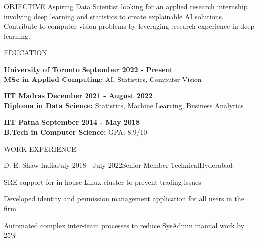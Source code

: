 \documentclass{resume}
\begin{document}
  \begin{rSection}{OBJECTIVE}
    Aspiring Data Scientist looking for an applied research internship involving deep learning
    and statistics to create explainable AI solutions. Contribute to computer vision problems
    by leveraging research experience in deep learning.
  \end{rSection}

  \begin{rSection}{EDUCATION}

    {\bf University of Toronto} \hfill {\bf September 2022 - Present} \\
    {\bf MSc in Applied Computing:} AI, Statistics, Computer Vision

    {\bf IIT Madras} \hfill {\bf December 2021 - August 2022} \\
    {\bf Diploma in Data Science:} Statistics, Machine Learning, Business Analytics

    {\bf IIT Patna} \hfill {\bf September 2014 - May 2018} \\
    {\bf B.Tech in Computer Science:} GPA: 8.9/10

  \end{rSection}

  \begin{rSection}{WORK EXPERIENCE}
  
    \begin{rSubsection}{D. E. Shaw India}{July 2018 - July 2022}{Senior Member Technical}{Hyderabad}
      \item SRE support for in-house Linux cluster to prevent trading issues
      \item Developed identity and permission management application for all users in the firm
      \item Automated complex inter-team processes to reduce SysAdmin manual work by 25\%
    \end{rSubsection}
  
  \end{rSection}
\end{document}
